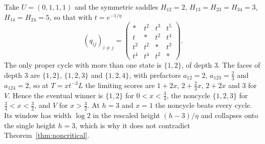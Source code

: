 \begin{example}\label{ex:four-state}
Take $U=(0,1,1,1)$ and the symmetric saddles $H_{12}=2$,
$H_{13}=H_{23}=H_{34}=3$, $H_{14}=H_{24}=5$, so that with $t=e^{-1/\eta}$
\[
 (q_{ij})_{i\ne j}=\begin{pmatrix}*&t^2&t^3&t^5\\ t&*&t^2&t^4\\ t^2&t^2&*&t^2\\ t^4&t^4&t^2&*\end{pmatrix}.
\]
The only proper cycle with more than one state is $\{1,2\}$, of depth $3$. The
faces of depth $3$ are $\{1,2\}$, $\{1,2,3\}$ and $\{1,2,4\}$, with prefactors
$a_{12}=2$, $a_{123}=\frac23$ and $a_{124}=2$, so at $T=xt^{-3}L$ the limiting
scores are $1+2x$, $2+\frac23x$, $2+2x$ and $3$ for $V$. Hence the eventual
winner is $\{1,2\}$ for $0<x<\frac34$, the noncycle $\{1,2,3\}$ for
$\frac34<x<\frac32$, and $V$ for $x>\frac32$. At $h=3$ and $x=1$ the noncycle
beats every cycle. Its window has width $\log2$ in the rescaled height
$(h-3)/\eta$ and collapses onto the single height $h=3$, which is why it does
not contradict Theorem~\ref{thm:noncritical}.
\end{example}

